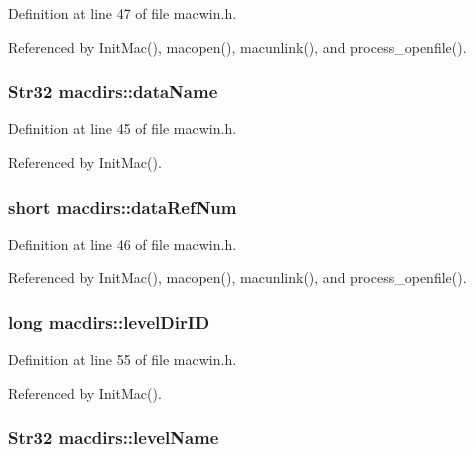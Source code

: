 Definition at line 47 of file macwin.\+h.



Referenced by Init\+Mac(), macopen(), macunlink(), and process\+\_\+openfile().

\hypertarget{structmacdirs_a1080cf50d459ea4cfe4a41a5437829a4}{
\subsubsection[{data\+Name}]{\setlength{\rightskip}{0pt plus 5cm}Str32 macdirs\+::data\+Name}}\label{structmacdirs_a1080cf50d459ea4cfe4a41a5437829a4}


Definition at line 45 of file macwin.\+h.



Referenced by Init\+Mac().

\hypertarget{structmacdirs_a803339ee5c502383a0fd1c95adc5f238}{
\subsubsection[{data\+Ref\+Num}]{\setlength{\rightskip}{0pt plus 5cm}short macdirs\+::data\+Ref\+Num}}\label{structmacdirs_a803339ee5c502383a0fd1c95adc5f238}


Definition at line 46 of file macwin.\+h.



Referenced by Init\+Mac(), macopen(), macunlink(), and process\+\_\+openfile().

\hypertarget{structmacdirs_a23c17f6b7ea647413e389b3048c1a7ba}{
\subsubsection[{level\+Dir\+I\+D}]{\setlength{\rightskip}{0pt plus 5cm}long macdirs\+::level\+Dir\+I\+D}}\label{structmacdirs_a23c17f6b7ea647413e389b3048c1a7ba}


Definition at line 55 of file macwin.\+h.



Referenced by Init\+Mac().

\hypertarget{structmacdirs_a6aac944171948db43f9167f72d7ef4b3}{
\subsubsection[{level\+Name}]{\setlength{\rightskip}{0pt plus 5cm}Str32 macdirs\+::level\+Name}}\label{structmacdirs_a6aac944171948db43f9167f72d7ef4b3}


